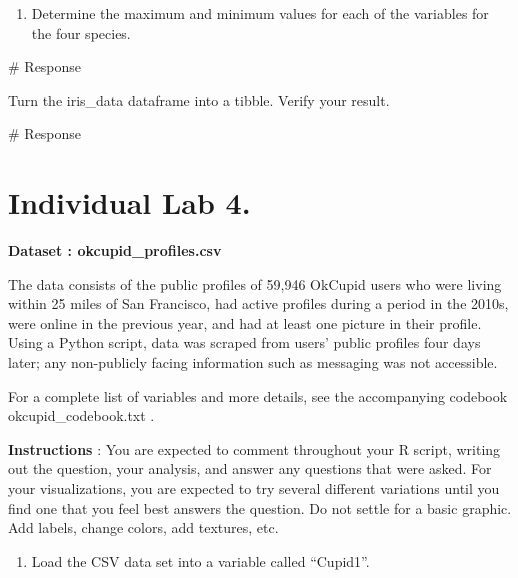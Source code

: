 \documentclass[
  letterpaper,
  DIV=11,
  numbers=noendperiod]{scrreprt}
\newenvironment{Shaded}{\begin{snugshade}}{\end{snugshade}}
\newcommand{\CommentTok}[1]{\textcolor[rgb]{0.37,0.37,0.37}{#1}}
\providecommand{\tightlist}{%
  \setlength{\itemsep}{0pt}\setlength{\parskip}{0pt}}\usepackage{longtable,booktabs,array}
\begin{document}
\begin{enumerate}
\def\labelenumi{(\alph{enumi})}
\setcounter{enumi}{3}
\tightlist
\item
  Determine the maximum and minimum values for each of the variables for
  the four species.
\end{enumerate}

\begin{Shaded}
\begin{Highlighting}[]
\CommentTok{\# Response}
\end{Highlighting}
\end{Shaded}

Turn the iris\_data dataframe into a tibble. Verify your result.

\begin{Shaded}
\begin{Highlighting}[]
\CommentTok{\# Response}
\end{Highlighting}
\end{Shaded}

\chapter*{Individual Lab 4.}\label{individual-lab-4.}


\textbf{Dataset : okcupid\_profiles.csv}

The data consists of the public profiles of 59,946 OkCupid users who
were living within 25 miles of San Francisco, had active profiles during
a period in the 2010s, were online in the previous year, and had at
least one picture in their profile. Using a Python script, data was
scraped from users' public profiles four days later; any non-publicly
facing information such as messaging was not accessible.

For a complete list of variables and more details, see the accompanying
codebook okcupid\_codebook.txt .

\textbf{Instructions} : You are expected to comment throughout your R
script, writing out the question, your analysis, and answer any
questions that were asked. For your visualizations, you are expected to
try several different variations until you find one that you feel best
answers the question. Do not settle for a basic graphic. Add labels,
change colors, add textures, etc.

\begin{enumerate}
\def\labelenumi{\arabic{enumi}.}
\tightlist
\item
  Load the CSV data set into a variable called ``Cupid1''.
\end{enumerate}
\end{document}
